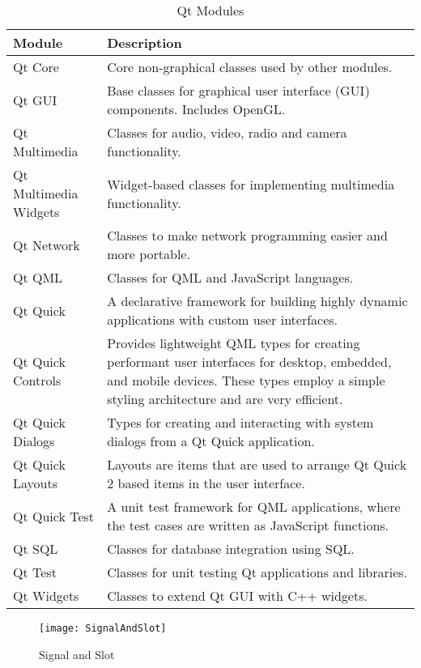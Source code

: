 \begin{table}[htb]
\centering
\caption {Qt Modules\label{tab:Qt Modules}}
\begin{tabular}{p{}p{}}
\hline
Module & Description \\
\hline
Qt Core & Core non-graphical classes used by other modules. \\ 
Qt GUI & Base classes for graphical user interface (GUI) components. Includes OpenGL. \\
Qt Multimedia & Classes for audio, video, radio and camera functionality. \\
Qt Multimedia \newline Widgets & Widget-based classes for implementing multimedia functionality. \\
Qt Network & Classes to make network programming easier and more portable. \\
Qt QML & Classes for QML and JavaScript languages. \\
Qt Quick & A declarative framework for building highly dynamic applications with custom user interfaces. \\
Qt Quick Controls & Provides lightweight QML types for creating performant user interfaces for desktop, embedded, and mobile devices. These types employ a simple styling architecture and are very efficient. \\
Qt Quick Dialogs & Types for creating and interacting with system dialogs from a Qt Quick application. \\
Qt Quick Layouts & Layouts are items that are used to arrange Qt Quick 2 based items in the user interface. \\
Qt Quick Test & A unit test framework for QML applications, where the test cases are written as JavaScript functions. \\
Qt SQL & Classes for database integration using SQL. \\
Qt Test & Classes for unit testing Qt applications and libraries. \\
Qt Widgets & Classes to extend Qt GUI with C++ widgets. \\
\hline
\end{tabular}
\end{table}

\begin{figure}[htb]
\centering
\texttt{[image: SignalAndSlot]}
\caption{Signal and Slot\label{fig:Signal and Slot}}
\end{figure}

